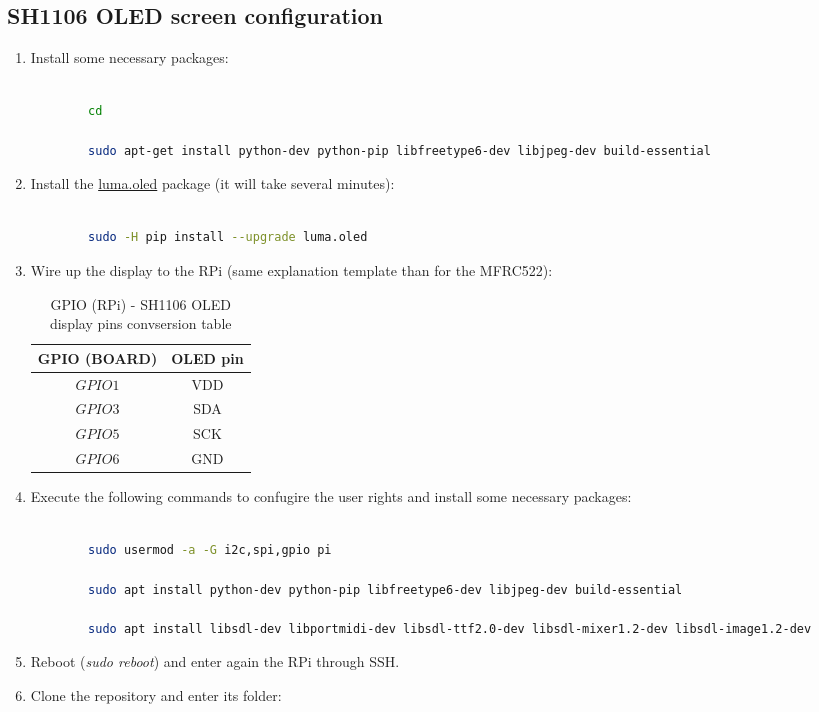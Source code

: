 \documentclass[12pt,a4paper,oneside]{article} %
\begin{document}
\pagebreak

\subsection{SH1106 OLED screen configuration}

\begin{enumerate}
	\item Install some necessary packages:
	\begin{lstlisting}[language=sh]
	
		cd
		
		sudo apt-get install python-dev python-pip libfreetype6-dev libjpeg-dev build-essential
	\end{lstlisting}
	\item Install the \href{https://luma-oled.readthedocs.io/en/latest/}{luma.oled} package (it will take several minutes):
	\begin{lstlisting}[language=sh]
	
		sudo -H pip install --upgrade luma.oled
	\end{lstlisting}
	\item Wire up the display to the RPi (same explanation template than for the MFRC522):
	\setlength{\arrayrulewidth}{0.8mm}
	\begin{table}[h]
	\centering
	\begin{tabular}{| c | c |}
		\hline
		\textbf{GPIO (BOARD)} & \textbf{OLED pin} \\ \hline
		$GPIO 1$ & VDD \\ \hline
		$GPIO 3$ & SDA \\ \hline
		$GPIO 5$ & SCK \\ \hline
		$GPIO 6$ & GND \\ \hline
	\end{tabular}
	\caption{GPIO (RPi) - SH1106 OLED display pins convsersion table}
	\label{gpio-oled}
	\end{table}
	\item Execute the following commands to confugire the user rights and install some necessary packages:
	\begin{lstlisting}[language=sh]
	
		sudo usermod -a -G i2c,spi,gpio pi
		
		sudo apt install python-dev python-pip libfreetype6-dev libjpeg-dev build-essential
		
		sudo apt install libsdl-dev libportmidi-dev libsdl-ttf2.0-dev libsdl-mixer1.2-dev libsdl-image1.2-dev
	\end{lstlisting}
	\item Reboot (\textit{sudo reboot}) and enter again the RPi through SSH.
	\item Clone the repository and enter its folder:
	\begin{lstlisting}[language=sh]
	

\end{lstlisting}
\end{enumerate}
\end{document}
